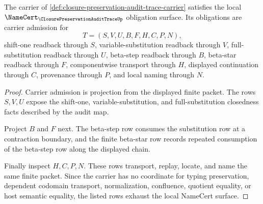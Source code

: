 \begin{theorem}
\label{thm:closure-preservation-audit-trace-namecert-obligations}
The carrier of \autoref{def:closure-preservation-audit-trace-carrier} satisfies the local $\NameCert_{\ClosurePreservationAuditTraceUp}$ obligation surface. Its obligations are carrier admission for
$$
T=(S,V,U,B,F,H,C,P,N),
$$
shift-one readback through $S$, variable-substitution readback through $V$, full-substitution readback through $U$, beta-step readback through $B$, beta-star readback through $F$, componentwise transport through $H$, displayed continuation through $C$, provenance through $P$, and local naming through $N$.
\end{theorem}
\begin{proof}
Carrier admission is projection from the displayed finite packet. The rows $S,V,U$ expose the shift-one, variable-substitution, and full-substitution closedness facts described by the audit map.

Project $B$ and $F$ next. The beta-step row consumes the substitution row at a contraction boundary, and the finite beta-star row records repeated consumption of the beta-step row along the displayed chain.

Finally inspect $H,C,P,N$. These rows transport, replay, locate, and name the same finite packet. Since the carrier has no coordinate for typing preservation, dependent codomain transport, normalization, confluence, quotient equality, or host semantic equality, the listed rows exhaust the local NameCert surface.
\end{proof}

